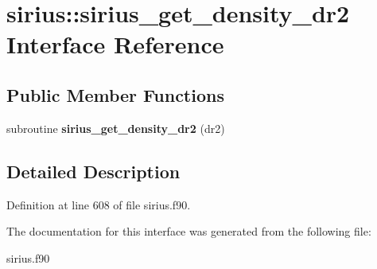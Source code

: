 \hypertarget{interfacesirius_1_1sirius__get__density__dr2}{}\section{sirius\+:\+:sirius\+\_\+get\+\_\+density\+\_\+dr2 Interface Reference}
\label{interfacesirius_1_1sirius__get__density__dr2}
\subsection*{Public Member Functions}
\begin{DoxyCompactItemize}
\item 
\hypertarget{interfacesirius_1_1sirius__get__density__dr2_afa669f71bebceac455c5566733a7790b}{}subroutine {\bfseries sirius\+\_\+get\+\_\+density\+\_\+dr2} (dr2)\label{interfacesirius_1_1sirius__get__density__dr2_afa669f71bebceac455c5566733a7790b}

\end{DoxyCompactItemize}


\subsection{Detailed Description}


Definition at line 608 of file sirius.\+f90.



The documentation for this interface was generated from the following file\+:\begin{DoxyCompactItemize}
\item 
sirius.\+f90\end{DoxyCompactItemize}
